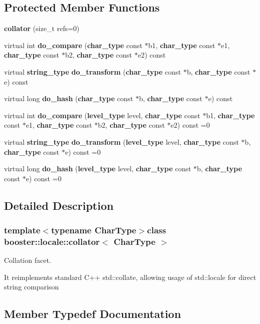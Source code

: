 \subsection*{\-Protected \-Member \-Functions}
\begin{DoxyCompactItemize}
\item 
{\bf collator} (size\-\_\-t refs=0)
\item 
virtual int {\bf do\-\_\-compare} ({\bf char\-\_\-type} const $\ast$b1, {\bf char\-\_\-type} const $\ast$e1, {\bf char\-\_\-type} const $\ast$b2, {\bf char\-\_\-type} const $\ast$e2) const 
\item 
virtual {\bf string\-\_\-type} {\bf do\-\_\-transform} ({\bf char\-\_\-type} const $\ast$b, {\bf char\-\_\-type} const $\ast$e) const 
\item 
virtual long {\bf do\-\_\-hash} ({\bf char\-\_\-type} const $\ast$b, {\bf char\-\_\-type} const $\ast$e) const 
\item 
virtual int {\bf do\-\_\-compare} ({\bf level\-\_\-type} level, {\bf char\-\_\-type} const $\ast$b1, {\bf char\-\_\-type} const $\ast$e1, {\bf char\-\_\-type} const $\ast$b2, {\bf char\-\_\-type} const $\ast$e2) const =0
\item 
virtual {\bf string\-\_\-type} {\bf do\-\_\-transform} ({\bf level\-\_\-type} level, {\bf char\-\_\-type} const $\ast$b, {\bf char\-\_\-type} const $\ast$e) const =0
\item 
virtual long {\bf do\-\_\-hash} ({\bf level\-\_\-type} level, {\bf char\-\_\-type} const $\ast$b, {\bf char\-\_\-type} const $\ast$e) const =0
\end{DoxyCompactItemize}


\subsection{\-Detailed \-Description}
\subsubsection*{template$<$typename Char\-Type$>$class booster\-::locale\-::collator$<$ Char\-Type $>$}

\-Collation facet. 

\-It reimplements standard \-C++ std\-::collate, allowing usage of std\-::locale for direct string comparison 

\subsection{\-Member \-Typedef \-Documentation}
